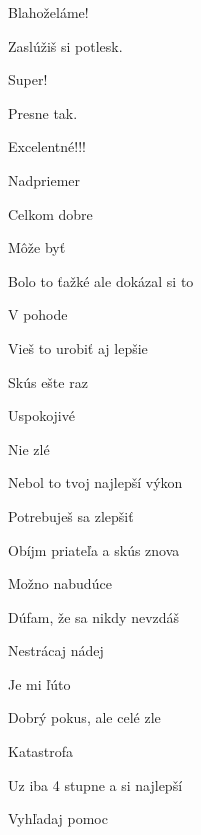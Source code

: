  Blahoželáme!

 Zaslúžiš si potlesk.

 Super!

 Presne tak.

 Excelentné!!!

 Nadpriemer

 Celkom dobre

 Môže byť

 Bolo to ťažké ale dokázal si to

 V pohode

 Vieš to urobiť aj lepšie

 Skús ešte raz

 Uspokojivé

 Nie zlé

 Nebol to tvoj najlepší výkon

 Potrebuješ sa zlepšiť

 Obíjm priateľa a skús znova

 Možno nabudúce

 Dúfam, že sa nikdy nevzdáš

 Nestrácaj nádej

 Je mi ľúto

 Dobrý pokus, ale celé zle

 Katastrofa

 Uz iba 4 stupne a si najlepší

 Vyhľadaj pomoc

